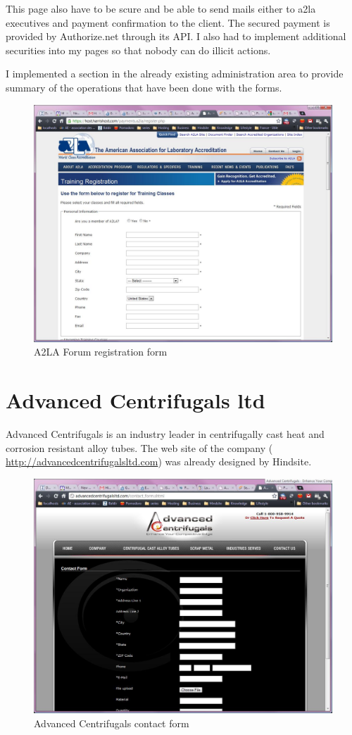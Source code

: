 This page also have to be scure and be able to send mails either to a2la executives and payment confirmation to the client.
The secured payment is provided by Authorize.net through its API. I also had to implement additional securities into my pages so that nobody can do illicit actions.

I implemented a section in the already existing administration area to provide summary of the operations that have been done with the forms.

\begin{figure}[!hb]
\centering
\includegraphics[width=.55\textwidth]{img/a2la.jpg}
\caption{A2LA Forum registration form}
\label{figure:a2la_reg}
\end{figure}


\section{Advanced Centrifugals ltd}
Advanced Centrifugals is an industry leader in centrifugally cast heat and corrosion resistant alloy tubes. 
The web site of the company ( \url{http://advancedcentrifugalsltd.com}) was already designed by Hindsite. 

\begin{figure}[!h]
\centering
\includegraphics[width=.55\textwidth]{img/adv_1.jpg}
\caption{Advanced Centrifugals contact form}
\label{figure:adv_1}
\end{figure}

